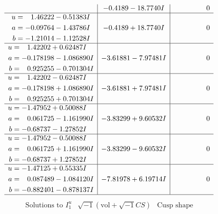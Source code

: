 \documentclass[1p]{elsarticle_modified}
\theoremstyle{definition}
\newcommand{\I}{\sqrt{-1}}
\begin{document}
$$\begin{array}{c|c|c}
 & -0.4189 - 18.7740 I & \phantom{-0.000000 } 0 \\ \hline\begin{aligned}
u &= \phantom{-}1.46222 - 0.51383 I \\
a &= -0.09764 - 1.43786 I \\
b &= -1.21014 - 1.12528 I\end{aligned}
 & -0.4189 + 18.7740 I & \phantom{-0.000000 } 0 \\ \hline\begin{aligned}
u &= \phantom{-}1.42202 + 0.62487 I \\
a &= -0.178198 - 1.086890 I \\
b &= \phantom{-}0.925255 - 0.701304 I\end{aligned}
 & -3.61881 - 7.97481 I & \phantom{-0.000000 } 0 \\ \hline\begin{aligned}
u &= \phantom{-}1.42202 - 0.62487 I \\
a &= -0.178198 + 1.086890 I \\
b &= \phantom{-}0.925255 + 0.701304 I\end{aligned}
 & -3.61881 + 7.97481 I & \phantom{-0.000000 } 0 \\ \hline\begin{aligned}
u &= -1.47952 + 0.50088 I \\
a &= \phantom{-}0.061725 - 1.161990 I \\
b &= -0.68737 - 1.27852 I\end{aligned}
 & -3.83299 + 9.60532 I & \phantom{-0.000000 } 0 \\ \hline\begin{aligned}
u &= -1.47952 - 0.50088 I \\
a &= \phantom{-}0.061725 + 1.161990 I \\
b &= -0.68737 + 1.27852 I\end{aligned}
 & -3.83299 - 9.60532 I & \phantom{-0.000000 } 0 \\ \hline\begin{aligned}
u &= -1.47125 + 0.55335 I \\
a &= \phantom{-}0.087489 - 1.084120 I \\
b &= -0.882401 - 0.878137 I\end{aligned}
 & -7.81978 + 6.19714 I & \phantom{-0.000000 } 0\\
 \hline 
 \end{array}$$\newpage$$\begin{array}{c|c|c}  
\text{Solutions to }I^u_{1}& \I (\text{vol} + \sqrt{-1}CS) & \text{Cusp shape}\\

\end{array}$$
\end{document}
